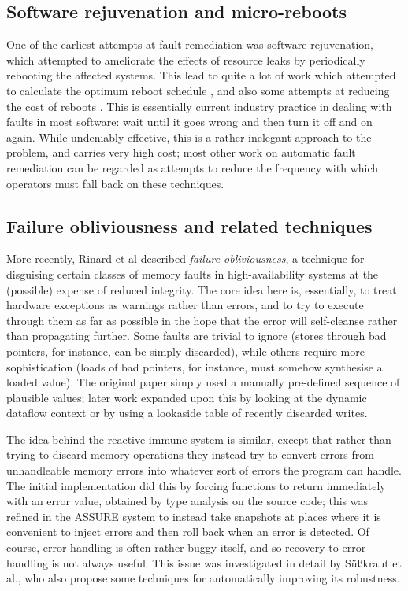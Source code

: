 \subsection{Software rejuvenation and micro-reboots}

One of the earliest attempts at fault remediation was software
rejuvenation\cite{Huang1995}, which attempted to ameliorate the
effects of resource leaks by periodically rebooting the affected
systems.  This lead to quite a lot of work which attempted to
calculate the optimum reboot schedule
\cite{Garg1998,Li2002,Vaidyanathan2001}, and also some attempts at
reducing the cost of reboots \cite{Candea2002,Patterson2002}.  This is
essentially current industry practice in dealing with faults in most
software: wait until it goes wrong and then turn it off and on again.
While undeniably effective, this is a rather inelegant approach to the
problem, and carries very high cost; most other work on automatic
fault remediation can be regarded as attempts to reduce the frequency
with which operators must fall back on these techniques.

\subsection{Failure obliviousness and related techniques}
More recently, Rinard et al\cite{Rinard2004} described \emph{failure
  obliviousness}, a technique for disguising certain classes of memory
faults in high-availability systems at the (possible) expense of
reduced integrity.  The core idea here is, essentially, to treat
hardware exceptions as warnings rather than errors, and to try to
execute through them as far as possible in the hope that the error
will self-cleanse rather than propagating further.  Some faults are
trivial to ignore (stores through bad pointers, for instance, can be
simply discarded), while others require more sophistication (loads of
bad pointers, for instance, must somehow synthesise a loaded value).
The original paper simply used a manually pre-defined sequence of
plausible values; later work expanded upon this by looking at the
dynamic dataflow context\cite{Nagarajan2009} or by using a lookaside
table of recently discarded writes\cite{Rinard2005a}.

The idea behind the reactive immune system\cite{Sidiroglou2005} is
similar, except that rather than trying to discard memory operations
they instead try to convert errors from unhandleable memory errors
into whatever sort of errors the program can handle.  The initial
implementation did this by forcing functions to return immediately
with an error value, obtained by type analysis on the source code;
this was refined in the ASSURE system\cite{Sidiroglou2009} to instead
take snapshots at places where it is convenient to inject errors and
then roll back when an error is detected.  Of course, error handling
is often rather buggy itself, and so recovery to error handling is not
always useful.  This issue was investigated in detail by
S\"{u}\ss{}kraut et al.\cite{Susskraut2006}, who also propose some
techniques for automatically improving its robustness.

